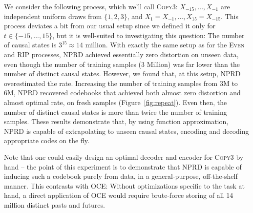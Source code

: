 \documentclass[11pt,letterpaper]{article}
\begin{document}
We consider the following process, which we'll call \textsc{Copy3}: $X_{-15}, ..., X_{-1}$ are independent uniform draws from $\{1,2,3\}$, and $X_1 = X_{-1}, ..., X_{15} = X_{-15}$.
This process deviates a bit from our usual setup since we defined it only for $t \in \{-15, ..., 15\}$, but it is well-suited to investigating this question:
The number of causal states is $3^{15} \approx 14$ million.
With exactly the same setup as for the \textsc{Even} and \textsc{RIP} processes, NPRD achieved essentially zero distortion on unseen data, even though the number of training samples (3 Million) was far lower than the number of distinct causal states.
However, we found that, at this setup, NPRD overestimated the rate.
Increasing the number of training samples from 3M to 6M, NPRD recovered codebooks that achieved both almost zero distortion and almost optimal rate, on fresh samples (Figure~\ref{fig:repeat}).
Even then, the number of distinct causal states is more than twice the number of training samples.
These results demonstrate that, by using function approximation, NPRD is capable of extrapolating to unseen causal states, encoding and decoding appropriate codes on the fly.


Note that one could easily design an optimal decoder and encoder for \textsc{Copy3} by hand -- the point of this experiment is to demonstrate that NPRD is capable of inducing such a codebook purely from data, in a general-purpose, off-the-shelf manner.
This contrasts with OCE:
Without optimizations specific to the task at hand, a direct application of OCE would require brute-force storing of all 14 million distinct pasts and futures.


%
%
%
%
%
\end{document}
